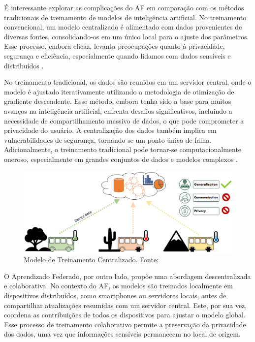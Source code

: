 É interessante explorar as complicações do AF em comparação com os métodos tradicionais de treinamento de modelos de inteligência artificial. No treinamento convencional, um modelo centralizado é alimentado com dados provenientes de diversas fontes, consolidando-os em um único local para o ajuste dos parâmetros. Esse processo, embora eficaz, levanta preocupações quanto à privacidade, segurança e eficiência, especialmente quando lidamos com dados sensíveis e distribuídos \cite{goodfellow2016deep}.

No treinamento tradicional, os dados são reunidos em um servidor central, onde o modelo é ajustado iterativamente utilizando a metodologia de otimização de gradiente descendente. Esse método, embora tenha sido a base para muitos avanços na inteligência artificial, enfrenta desafios significativos, incluindo a necessidade de compartilhamento massivo de dados, o que pode comprometer a privacidade do usuário. A centralização dos dados também implica em vulnerabilidades de segurança, tornando-se um ponto único de falha. Adicionalmente, o treinamento tradicional pode tornar-se computacionalmente oneroso, especialmente em grandes conjuntos de dados e modelos complexos \cite{sutskever2013importance}.

\begin{figure}[ht]
    \centering
    \includegraphics[scale=0.50]{figuras/TraditionalCentralizedLearning.eps}
    \caption{Modelo de Treinamento Centralizado. Fonte: 
    \cite{ekkonoFederatedLearning}}
    \label{fig:TraditionalCentralizedLearning}
\end{figure}

O Aprendizado Federado, por outro lado, propõe uma abordagem descentralizada e colaborativa. No contexto do AF, os modelos são treinados localmente em dispositivos distribuídos, como smartphones ou servidores locais, antes de compartilhar atualizações resumidas com um servidor central. Este, por sua vez, coordena as contribuições de todos os dispositivos para ajustar o modelo global. Esse processo de treinamento colaborativo permite a preservação da privacidade dos dados, uma vez que informações sensíveis permanecem no local de origem\cite{mcmahan2017communication}.

